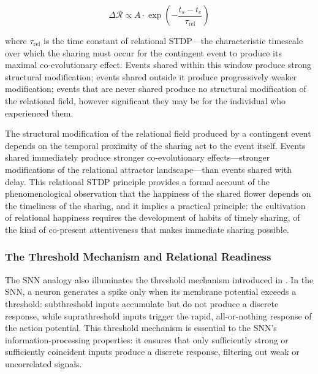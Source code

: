 \begin{equation}
\Delta \mathcal{R} \propto A \cdot \exp\!\left(-\frac{t_s - t_e}{\tau_{\mathrm{rel}}}\right)
\end{equation}

where $\tau_{\mathrm{rel}}$ is the time constant of relational STDP---the characteristic timescale over which the sharing must occur for the contingent event to produce its maximal co-evolutionary effect. Events shared within this window produce strong structural modification; events shared outside it produce progressively weaker modification; events that are never shared produce no structural modification of the relational field, however significant they may be for the individual who experienced them.

\begin{claim}
The structural modification of the relational field produced by a contingent event depends on the temporal proximity of the sharing act to the event itself. Events shared immediately produce stronger co-evolutionary effects---stronger modifications of the relational attractor landscape---than events shared with delay. This relational STDP principle provides a formal account of the phenomenological observation that the happiness of the shared flower depends on the timeliness of the sharing, and it implies a practical principle: the cultivation of relational happiness requires the development of habits of timely sharing, of the kind of co-present attentiveness that makes immediate sharing possible.
\end{claim}

\subsubsection{The Threshold Mechanism and Relational Readiness}
\label{p14:subsubsec:threshold2}

\noindent
The SNN analogy also illuminates the threshold mechanism introduced in . In the SNN, a neuron generates a spike only when its membrane potential exceeds a threshold: subthreshold inputs accumulate but do not produce a discrete response, while suprathreshold inputs trigger the rapid, all-or-nothing response of the action potential. This threshold mechanism is essential to the SNN's information-processing properties: it ensures that only sufficiently strong or sufficiently coincident inputs produce a discrete response, filtering out weak or uncorrelated signals.

